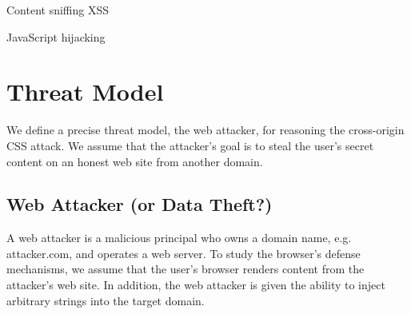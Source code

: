 \documentclass{acm_proc_article-sp}
\begin{document}
Content sniffing XSS\cite{securecontentsniffing}

JavaScript hijacking\cite{jshijacking}

\section{Threat Model}
We define a precise threat model, the web attacker, for reasoning the cross-origin CSS attack. We assume that the attacker's goal is to steal the user's secret content on an honest web site from another domain.

\subsection{Web Attacker (or Data Theft?)}
A web attacker is a malicious principal who owns a domain name, e.g. attacker.com, and operates a web server. To study the browser's defense mechanisms, we assume that the user's browser renders content from the attacker's web site. In addition, the web attacker is given the ability to inject arbitrary strings into the target domain.
\end{document}

